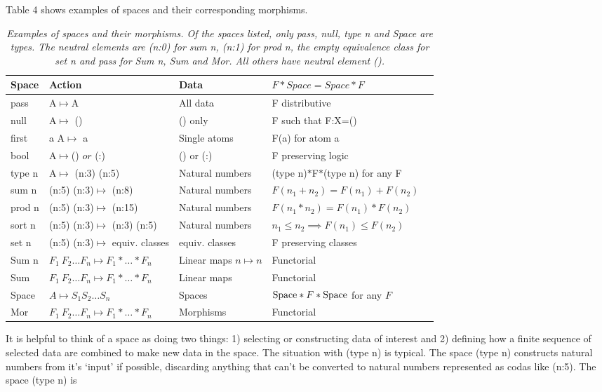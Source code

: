\documentclass[11pt]{article}
\begin{document}
Table 4 shows examples of spaces and their corresponding morphisms.
\begin{table}
\begin{tabular}{| l | l | l | l | l |  }
Space & Action & Data &  $F*Space=Space*F$ \\
\hline
pass & A$\mapsto$A & All data & F distributive \\
null & A$\mapsto$ () & () only & F such that F:X=() \\
first & a A$\mapsto$ a & Single atoms &  F(a) for atom a \\
bool & A$\mapsto$() $or$ (:) & () or (:) &  F preserving logic \\
type n & A$\mapsto$ (n:3) (n:5) & Natural numbers &  (type n)$*$F$*$(type n) for any F \\
sum n & (n:5) (n:3)$\mapsto$ (n:8) & Natural numbers &  $F(n_1+n_2)=F(n_1)+F(n_2)$ \\
prod n & (n:5) (n:3)$\mapsto$ (n:15) & Natural numbers &  $F(n_1*n_2)=F(n_1)*F(n_2)$ \\
sort n & (n:5) (n:3)$\mapsto$ (n:3) (n:5) & Natural numbers & $n_1\le n_2 \implies F(n_1)\le F(n_2)$ \\
set n & (n:5) (n:3)$\mapsto$ equiv. classes & equiv. classes & F preserving classes \\
Sum n & $F_1\ F_2\dots F_n\mapsto F_1*\dots *F_n$ & Linear maps $n\mapsto n$ & Functorial \\
Sum & $F_1\ F_2\dots F_n\mapsto F_1*\dots *F_n$ & Linear maps  & Functorial \\
Space & $A\mapsto S_1 S_2\dots S_n$ & Spaces & ${\rm Space}*F*{\rm Space}$ for any $F$\\
Mor & $F_1\ F_2\dots F_n\mapsto F_1*\dots *F_n$ & Morphisms & Functorial \\
\hline
\end{tabular}
\caption{{\it Examples of spaces and their morphisms.  Of the spaces listed, only pass, null, type n and Space are types.
The neutral elements are (n:0) for sum n, (n:1) for prod n, the empty equivalence class for set n and pass for Sum n, Sum and Mor.  All others have neutral element ().}}
\end{table}
It is helpful to think of a space as doing two things:  1) selecting or constructing data of interest and 2) defining how
a finite sequence of selected data are combined to make new data in the space.
The situation with (type n) is typical.  The space (type n) constructs natural numbers from it's `input' if possible,
discarding anything that can't be converted to natural numbers represented as codas like (n:5).  The space (type n) is
\end{document}
